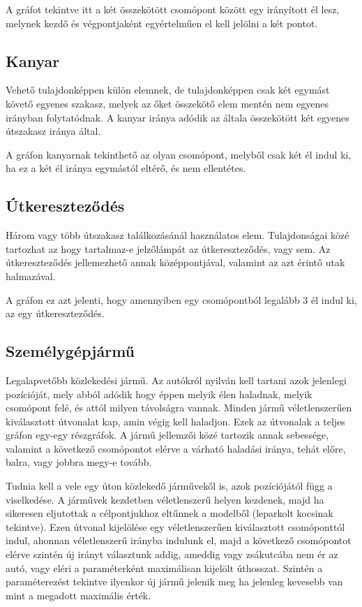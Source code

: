 A gráfot tekintve itt a két összekötött csomópont között egy irányított él lesz, melynek kezdő és végpontjaként egyértelműen el kell jelölni a két pontot.
\subsection{Kanyar}
Vehető tulajdonképpen külön elemnek, de tulajdonképpen csak két egymást követő egyenes szakasz, melyek az őket összekötő elem mentén nem egyenes irányban folytatódnak. A kanyar iránya adódik az általa összekötött két egyenes útszakasz iránya által.

A gráfon kanyarnak tekinthető az olyan csomópont, melyből csak két él indul ki, ha ez a két él iránya egymástól eltérő, és nem ellentétes.
\subsection{Útkereszteződés}
Három vagy több útszakasz találkozásánál használatos elem. Tulajdonságai közé tartozhat az hogy tartalmaz-e jelzőlámpát az útkereszteződés, vagy sem.
Az útkereszteződés jellemezhető annak középpontjával, valamint az azt érintő utak halmazával.

A gráfon ez azt jelenti, hogy amennyiben egy csomópontból legalább 3 él indul ki, az egy útkereszteződés.
\subsection{Személygépjármű}
Legalapvetőbb közlekedési jármű. Az autókról nyilván kell tartani azok jelenlegi pozícióját, mely abból adódik hogy éppen melyik élen haladnak, melyik csomópont felé, és attól milyen távolságra vannak. Minden jármű véletlenszerűen kiválasztott útvonalat kap, amin végig kell haladjon. Ezek az útvonalak a teljes gráfon egy-egy részgráfok. A jármű jellemzői közé tartozik annak sebessége, valamint a következő csomópontot elérve a várható haladási iránya, tehát előre, balra, vagy jobbra megy-e tovább. 

Tudnia kell a vele egy úton közlekedő járművekől is, azok pozíciójától függ a viselkedése. A járművek kezdetben véletlenszerű helyen kezdenek, majd ha sikeresen eljutottak a célpontjukhoz 
eltűnnek a modelből (leparkolt kocsinak tekintve). Ezen útvonal kijelölése egy véletlenszerűen kiválasztott csomóponttól indul, ahonnan véletlenszerű irányba indulunk el, majd a következő csomópontot elérve szintén új irányt választunk addig, ameddig vagy zsákutcába nem ér az autó, vagy eléri a paraméterként maximálisan kijelölt úthosszat. Szintén a paraméterezést tekintve ilyenkor új jármű jelenik meg ha jelenleg kevesebb van mint a megadott maximális érték.

